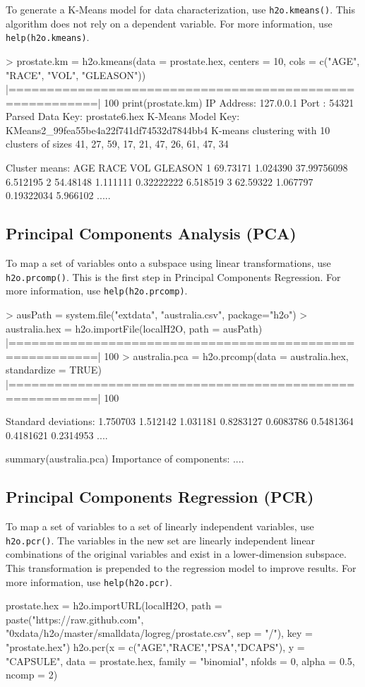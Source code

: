 \documentclass[11pt]{article}
\begin{document}
To generate a K-Means model for data characterization, use {\texttt{h2o.kmeans()}}. This algorithm does not rely on a dependent variable. For more information, use {\texttt{help(h2o.kmeans)}}.
\begin{spverbatim}
> prostate.km = h2o.kmeans(data = prostate.hex, centers = 10,
cols = c("AGE", "RACE", "VOL", "GLEASON"))
  |=========================================================| 100%
print(prostate.km)
IP Address: 127.0.0.1
Port      : 54321
Parsed Data Key: prostate6.hex
K-Means Model Key: KMeans2_99fea55be4a22f741df74532d7844bb4
K-means clustering with 10 clusters of sizes 41, 27, 59, 17, 21, 47, 26, 61, 47, 34

      Cluster means:
      AGE     RACE         VOL  GLEASON
      1  69.73171 1.024390 37.99756098 6.512195
      2  54.48148 1.111111  0.32222222 6.518519
      3  62.59322 1.067797  0.19322034 5.966102
      .....
\end{spverbatim}

\subsection{Principal Components Analysis (PCA)}

To map a set of variables onto a subspace using linear transformations, use {\texttt{h2o.prcomp()}}. This is the first step in Principal Components Regression. For more information, use {\texttt{help(h2o.prcomp)}}.
\begin{spverbatim}
> ausPath = system.file("extdata", "australia.csv", package="h2o")
> australia.hex = h2o.importFile(localH2O, path = ausPath)
  |=========================================================| 100%
> australia.pca = h2o.prcomp(data = australia.hex, standardize = TRUE)
  |=========================================================| 100%

 Standard deviations:
 1.750703 1.512142 1.031181 0.8283127 0.6083786 0.5481364 0.4181621 0.2314953
      ....

summary(australia.pca)
Importance of components:
....
\end{spverbatim}

\subsection{Principal Components Regression (PCR)}

To map a set of variables to a set of linearly independent variables, use {\texttt{h2o.pcr()}}. The variables in the new set are linearly independent linear combinations of the original variables and exist in a lower-dimension subspace. This transformation is prepended to the regression model to improve results. For more information, use {\texttt{help(h2o.pcr)}}.
\begin{spverbatim}
prostate.hex = h2o.importURL(localH2O, path = paste("https://raw.github.com", 
  "0xdata/h2o/master/smalldata/logreg/prostate.csv", sep = "/"), key = "prostate.hex")
h2o.pcr(x = c("AGE","RACE","PSA","DCAPS"), y = "CAPSULE", data = prostate.hex, family = "binomial", 
  nfolds = 0, alpha = 0.5, ncomp = 2)
\end{spverbatim}
\end{document}
